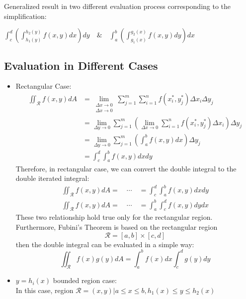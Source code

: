 \documentclass[UTF8,a4paper, 10pt, openany]{svmono}
\begin{document}
Generalized result in two different evaluation process corresponding to the simplification:

\begin{center}
$\boxed{\displaystyle\int_{c}^{d}\left(\displaystyle\int_{h_1(y)}^{h_2(y)}f(x,y)dx\right)dy \quad \& \quad \displaystyle\int_{a}^{b}\left(\displaystyle\int_{g_1(x)}^{g_2(x)}f(x,y)dy\right)dx}$
\end{center}

\subsection{Evaluation in Different Cases}
\begin{itemize}
\item Rectangular Case:
\begin{align*}
\iint_{\mathcal{R}}f(x,y)dA &= \lim_{\substack{\Delta x\to 0\\ \Delta x\to 0}}\displaystyle\sum_{j=1}^{m}\displaystyle\sum_{i=1}^{n} f(x_i^*,y_j^*)\Delta x_{i}\Delta y_{j}\\
&= \lim_{\Delta y\to 0}\displaystyle\sum_{j=1}^{m}\left(\lim_{\Delta x\to 0}\displaystyle\sum_{i=1}^{n} f(x_i^*,y_j^*)\Delta x_{i} \right)\Delta y_{j}\\
&= \lim_{\Delta y\to 0}\displaystyle\sum_{j=1}^{m}\left(\displaystyle\int_{a}^{b}f(x,y)dx \right)\Delta y_{j}\\
&= \displaystyle\int_{c}^{d}\displaystyle\int_{a}^{b}f(x,y)dxdy
\end{align*}
Therefore, in rectangular case, we can convert the double integral to the double iterated integral:
\begin{align*}
\iint_{\mathcal{R}}f(x,y)dA =\quad \cdots \quad=\displaystyle\int_{c}^{d}\displaystyle\int_{a}^{b}f(x,y)dxdy \\
\iint_{\mathcal{R}}f(x,y)dA =\quad \cdots \quad=\displaystyle\int_{a}^{b}\displaystyle\int_{c}^{d}f(x,y)dydx
\end{align*}
These two relationship hold true only for the rectangular region.\\
Furthermore, Fubini's Theorem is based on the rectangular region
$$\mathcal{R}=[a,b]\times [c,d]$$
then the double integral can be evaluated in a simple way:
$$\iint_{\mathcal{R}}f(x)g(y)dA=\int_{a}^{b}f(x)dx\int_{c}^{d}g(y)dy$$
\item $y=h_{i}(x)$ bounded region case:\\
In this case, region $\mathcal{R}={(x,y)|a\leq x\leq b, h_{1}(x)\leq y\leq h_{2}(x)}$
\begin{align*}

\end{align*}
\end{itemize}
\end{document}
